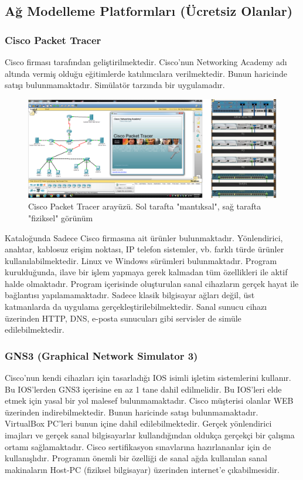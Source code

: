 \subsection{Ağ Modelleme Platformları (Ücretsiz Olanlar)}
\subsubsection{Cisco Packet Tracer}
Cisco firması tarafından geliştirilmektedir. Cisco'nun Networking Academy adı altında vermiş olduğu eğitimlerde katılımcılara verilmektedir. Bunun haricinde satışı bulunmamaktadır. Simülatör tarzında bir uygulamadır.

\begin{figure}[h]
    \centering
    \includegraphics[width=\textwidth]{images/SimulatorCiscoPT.png}
    \caption{Cisco Packet Tracer arayüzü. Sol tarafta "mantıksal", sağ tarafta "fiziksel" görünüm}
    \label{fig:CiscoPT}
\end{figure}

Kataloğunda Sadece Cisco firmasına ait ürünler bulunmaktadır. Yönlendirici, anahtar, kablosuz erişim noktası, IP telefon sistemler, vb. farklı türde ürünler kullanılabilmektedir. Linux ve Windows sürümleri bulunmaktadır. Program kurulduğunda, ilave bir işlem yapmaya gerek kalmadan tüm özellikleri ile aktif halde olmaktadır. Program içerisinde oluşturulan sanal cihazların gerçek hayat ile bağlantısı yapılamamaktadır. Sadece klasik bilgisayar ağları değil, üst katmanlarda da uygulama gerçekleştirilebilmektedir. Sanal sunucu cihazı üzerinden HTTP, DNS, e-posta sunucuları gibi servisler de simüle edilebilmektedir.

\subsubsection{GNS3 (Graphical Network Simulator 3)}
Cisco'nun kendi cihazları için tasarladığı IOS isimli işletim sistemlerini kullanır. Bu IOS'lerden GNS3 içerisine en az 1 tane dahil edilmelidir. Bu IOS'leri elde etmek için yasal bir yol malesef bulunmamaktadır. Cisco müşterisi olanlar WEB üzerinden indirebilmektedir. Bunun haricinde satışı bulunmamaktadır. VirtualBox PC'leri bunun içine dahil edilebilmektedir. Gerçek yönlendirici imajları ve gerçek sanal bilgisayarlar kullandığından oldukça gerçekçi bir çalışma ortamı sağlamaktadır. Cisco sertifikasyon sınavlarına hazırlananlar için de kullanışlıdır. Programın önemli bir özelliği de sanal ağda kullanılan sanal makinaların Host-PC (fiziksel bilgisayar) üzerinden internet'e çıkabilmesidir.

